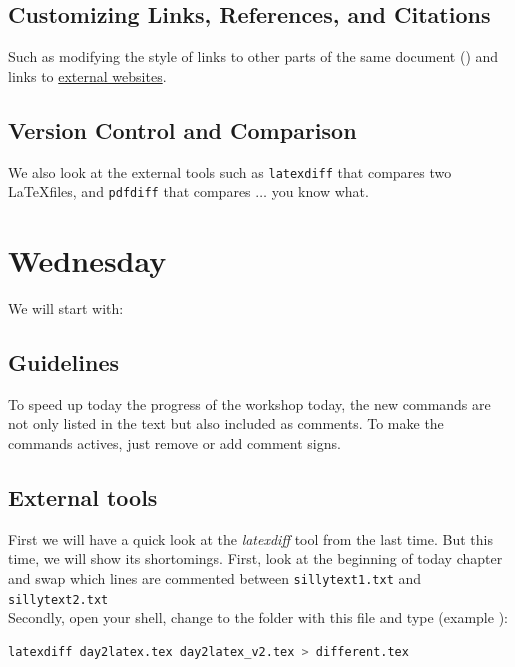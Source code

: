 \documentclass[a4paper,10pt]{report} %
\begin{document}
 \newpage 
 
 \section{Customizing Links, References, and Citations}
 Such as modifying the style of links to other parts of the same document () and links to \href{https://geomet.uni-koeln.de/en/}{external websites}.
 
 
 \section{Version Control and Comparison}
 We also look at the  external tools such as \texttt{latexdiff} that compares two \LaTeX files, and  \texttt{pdfdiff} that compares \( \ldots \) you know what.  
  


  
  
  
  
  
\chapter{Wednesday} \label{chap:wednesday}

 

We will start with:
  
%

\section{Guidelines}
To speed up today the progress of the workshop today, the new commands are not only listed in the text but also included as comments. To make the commands actives, just remove or add comment signs.

\section{External tools}
First we will have a quick look at the \emph{latexdiff} tool from the last time.
But this time, we will  show its shortomings. First, look at the beginning of today chapter and swap which lines are commented between  \texttt{sillytext1.txt} and \texttt{sillytext2.txt}\\
Secondly, open your shell, change to the folder with this file and type  (example ): 

\begin{lstlisting}[language={bash}, frame=single,basicstyle=\footnotesize]
  latexdiff day2latex.tex day2latex_v2.tex > different.tex
\end{lstlisting}~\vspace{1ex}
\end{document}

